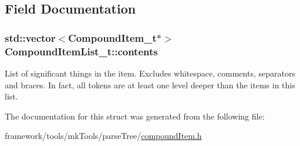 \subsection{Field Documentation}
\subsubsection[{\texorpdfstring{contents}{contents}}]{\setlength{\rightskip}{0pt plus 5cm}std\+::vector$<${\bf Compound\+Item\+\_\+t}$\ast$$>$ Compound\+Item\+List\+\_\+t\+::contents\hspace{0.3cm}{\ttfamily [private]}}\hypertarget{struct_compound_item_list__t_ae5db68f5fc1ee224d12d12d32d6eb209}{}\label{struct_compound_item_list__t_ae5db68f5fc1ee224d12d12d32d6eb209}
List of significant things in the item. Excludes whitespace, comments, separators and braces. In fact, all tokens are at least one level deeper than the items in this list. 

The documentation for this struct was generated from the following file\+:\begin{DoxyCompactItemize}
\item 
framework/tools/mk\+Tools/parse\+Tree/\hyperlink{compound_item_8h}{compound\+Item.\+h}\end{DoxyCompactItemize}
